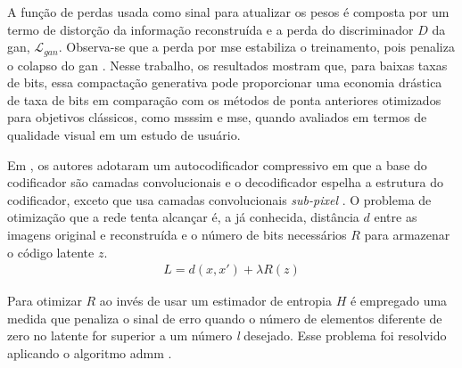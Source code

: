 A função de perdas usada como sinal para atualizar os pesos é composta por um termo de distorção da informação reconstruída e a perda do discriminador $D$ da \acrshort{gan}, $\mathcal{L}_{gan}$. Observa-se que a perda por \acrshort{mse} estabiliza o treinamento, pois penaliza o colapso do \acrshort{gan} \cite{agustsson2019generative}.
Nesse trabalho, os resultados mostram que, para baixas taxas de bits, essa compactação generativa pode proporcionar uma economia drástica de taxa de bits em comparação com os métodos de ponta anteriores otimizados para objetivos clássicos, como \acrshort{msssim} e \acrshort{mse}, quando avaliados em termos de qualidade visual em um estudo de usuário. 


Em \cite{zhao1901cae}, os autores adotaram um autocodificador compressivo em que a base do codificador são camadas convolucionais e o decodificador espelha a estrutura do codificador, exceto que usa  camadas convolucionais \textit{sub-pixel} \cite{li2018learning}. O problema de otimização que a rede tenta alcançar é, a já conhecida, distância $d$ entre as imagens original e reconstruída e o número de bits necessários $R$ para armazenar o código latente $z$.
\begin{equation}
\begin{aligned}
L = d(x,x') + \lambda R(z) 
\end{aligned}
\end{equation}

Para otimizar $R$ ao invés de usar um estimador de entropia $H$ é empregado uma medida que penaliza o sinal de erro quando o número de elementos diferente de zero no latente for superior a um número \textit{l} desejado. Esse problema foi resolvido aplicando o algoritmo \acrshort{admm} \cite{ye2018progressive}. 
